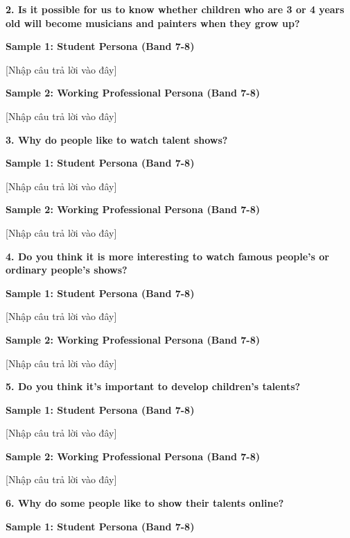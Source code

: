 \separator

\begin{ieltsquestion}
\textbf{2. Is it possible for us to know whether children who are 3 or 4 years old will become musicians and painters when they grow up?}
\end{ieltsquestion}
\textbf{Sample 1: Student Persona (Band 7-8)}

[Nhập câu trả lời vào đây]

\textbf{Sample 2: Working Professional Persona (Band 7-8)}

[Nhập câu trả lời vào đây]

\separator

\begin{ieltsquestion}
\textbf{3. Why do people like to watch talent shows?}
\end{ieltsquestion}
\textbf{Sample 1: Student Persona (Band 7-8)}

[Nhập câu trả lời vào đây]

\textbf{Sample 2: Working Professional Persona (Band 7-8)}

[Nhập câu trả lời vào đây]

\separator

\begin{ieltsquestion}
\textbf{4. Do you think it is more interesting to watch famous people's or ordinary people's shows?}
\end{ieltsquestion}
\textbf{Sample 1: Student Persona (Band 7-8)}

[Nhập câu trả lời vào đây]

\textbf{Sample 2: Working Professional Persona (Band 7-8)}

[Nhập câu trả lời vào đây]

\separator

\begin{ieltsquestion}
\textbf{5. Do you think it's important to develop children's talents?}
\end{ieltsquestion}
\textbf{Sample 1: Student Persona (Band 7-8)}

[Nhập câu trả lời vào đây]

\textbf{Sample 2: Working Professional Persona (Band 7-8)}

[Nhập câu trả lời vào đây]

\separator

\begin{ieltsquestion}
\textbf{6. Why do some people like to show their talents online?}
\end{ieltsquestion}
\textbf{Sample 1: Student Persona (Band 7-8)}

